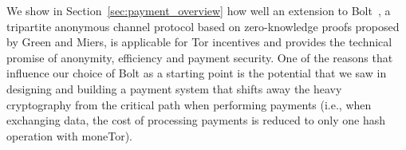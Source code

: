We show in Section~\ref{sec:payment_overview} how well an extension to
Bolt~\cite{green2017bolt}, a tripartite anonymous channel protocol based on
zero-knowledge proofs proposed by Green and Miers, is applicable for Tor
incentives and provides the technical promise of anonymity, efficiency and
payment security.
One of the reasons that influence our choice of Bolt as a starting point is the
potential that we saw in designing and building a payment system that shifts
away the heavy cryptography from the critical path when performing payments
(i.e., when exchanging data, the cost of processing payments is reduced to only
one hash operation with moneTor).


